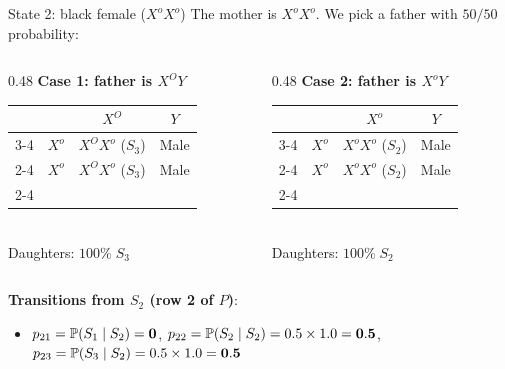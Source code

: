 \documentclass[aspectratio=169]{beamer}\usepackage[]{graphicx}\usepackage[]{xcolor}
\begin{document}
\begin{frame}{State 2: black female ($X^o X^o$)}
The mother is $X^o X^o$. We pick a father with $50/50$ probability:
\vfill
\begin{columns}[c]
\begin{column}{0.48\textwidth}
\centering
\textbf{Case 1: father is $X^O Y$}\\[0.1cm]
\renewcommand{\arraystretch}{1.25}
\begin{tabular}{c c | c | c |}
\multicolumn{2}{c}{} & \multicolumn{1}{c}{$X^O$} & \multicolumn{1}{c}{$Y$} \\ \cline{3-4}
\multirow{2}{*}{\rotatebox{90}{\footnotesize Mother}} & $X^o$ & \cellcolor{punnetttortie}$X^O X^o$ ($S_3$)& \cellcolor{punnettblack}Male \\ \cline{2-4}
& $X^o$ & \cellcolor{punnetttortie}$X^O X^o$ ($S_3$)& \cellcolor{punnettblack}Male \\ \cline{2-4}
\end{tabular}
\\[0.1cm]
Daughters: $100\%\; S_3$
\end{column}
\begin{column}{0.48\textwidth}
\centering
\textbf{Case 2: father is $X^o Y$}\\[0.1cm]
\renewcommand{\arraystretch}{1.25}
\begin{tabular}{c c | c | c |}
\multicolumn{2}{c}{} & \multicolumn{1}{c}{$X^o$} & \multicolumn{1}{c}{$Y$} \\ \cline{3-4}
\multirow{2}{*}{\rotatebox{90}{\footnotesize Mother}} & $X^o$ & \cellcolor{punnettblack}$X^o X^o$ ($S_2$)& \cellcolor{punnettblack}Male \\ \cline{2-4}
& $X^o$ & \cellcolor{punnettblack}$X^o X^o$ ($S_2$)& \cellcolor{punnettblack}Male \\ \cline{2-4}
\end{tabular}
\\[0.1cm]
Daughters: $100\%\; S_2$
\end{column}
\end{columns}
\vfill
\textbf{Transitions from $S_2$ (row 2 of $P$)}:
\begin{itemize}
\item $p_{21} = \mathbb{P}(S_1 \mid S_2) = \mathbf{0}$, \quad $p_{22} = \mathbb{P}(S_2 \mid S_2) = 0.5 \times 1.0 = \mathbf{0.5}$, \quad $p_{23} = \mathbb{P}(S_3 \mid S_2) = 0.5 \times 1.0 = \mathbf{0.5}$
\end{itemize}
\end{frame}
\end{document}
